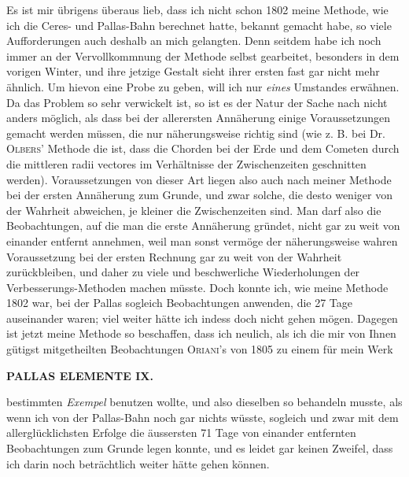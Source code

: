 \par\indent Es ist mir übrigens überaus lieb, dass ich nicht schon 1802 meine Methode, wie ich die Ceres- und Pallas-Bahn berechnet hatte, bekannt gemacht habe, so viele Aufforderungen auch deshalb an mich gelangten. Denn seitdem habe ich noch immer an der Vervollkommnung der Methode selbst gearbeitet, besonders in dem vorigen Winter, und ihre jetzige Gestalt sieht ihrer ersten fast gar nicht mehr ähnlich. Um hievon eine Probe zu geben, will ich nur \emph{eines} Umstandes erwähnen. Da das Problem so sehr verwickelt ist, so ist es der Natur der Sache nach nicht anders möglich, als dass bei der allerersten Annäherung einige Voraussetzungen gemacht werden müssen, die nur näherungsweise richtig sind (wie z. B. bei Dr. \textsc{Olbers}' Methode die ist, dass die Chorden bei der Erde und dem Cometen durch die mittleren radii vectores im Verhältnisse der Zwischenzeiten geschnitten werden). Voraussetzungen von dieser Art liegen also auch nach meiner Methode bei der ersten Annäherung zum Grunde, und zwar solche, die desto weniger von der Wahrheit abweichen, je kleiner die Zwischenzeiten sind. Man darf also die Beobachtungen, auf die man die erste Annäherung gründet, nicht gar zu weit von einander entfernt annehmen, weil man sonst vermöge der näherungsweise wahren Voraussetzung bei der ersten Rechnung gar zu weit von der Wahrheit zurückbleiben, und daher zu viele und beschwerliche Wiederholungen der Verbesserungs-Methoden machen müsste. Doch konnte ich, wie meine Methode 1802 war, bei der Pallas sogleich Beobachtungen anwenden, die 27 Tage auseinander waren; viel weiter hätte ich indess doch nicht gehen mögen. Dagegen ist jetzt meine Methode so beschaffen, dass ich neulich, als ich die mir von Ihnen gütigst mitgetheilten Beobachtungen \textsc{Oriani}'s von 1805 zu einem für mein Werk
\par
\clearpage
\endgroup
\begingroup
\pagestyle{empty}
\newcommand{\GaussVIGathering}[2]{%
  \fancypagestyle{gaussVIGathering}{%
    \fancyhf{}%
    \renewcommand{\headrulewidth}{0pt}%
    \renewcommand{\footrulewidth}{0pt}%
    \fancyfoot[C]{\makebox[\textwidth][l]{%
      \hspace*{.025\textwidth}{\footnotesize\bfseries #1}\hfill
      {\normalsize\bfseries\textls[90]{#2}}\hspace*{.18\textwidth}}}%
  }%
  \thispagestyle{gaussVIGathering}%
}
\thispagestyle{empty}
\noindent{}%
\makebox[12mm][l]{}%
\parbox[t]{\dimexpr\linewidth-24mm\relax}{\centering\footnotesize\bfseries PALLAS ELEMENTE IX.\par}%
\par\nobreak\medskip
\noindent bestimmten \emph{Exempel} benutzen wollte, und also dieselben so behandeln musste, als wenn ich von der
Pallas-Bahn noch gar nichts wüsste, sogleich und zwar mit dem allerglücklichsten Erfolge die äussersten
71 Tage von einander entfernten Beobachtungen zum Grunde legen konnte, und es leidet gar keinen
Zweifel, dass ich darin noch beträchtlich weiter hätte gehen können.

